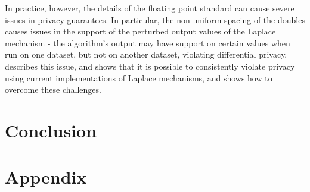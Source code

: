 \documentclass{article} %
\begin{document}
In practice, however, the details of the floating point standard can cause
severe issues in privacy guarantees. In particular, the non-uniform spacing of
the doubles causes issues in the support of the perturbed output values of the
Laplace mechanism - the algorithm's output may have support on certain values
when run on one dataset, but not on another dataset, violating differential
privacy. \cite{mironov2012significance} describes this issue, and shows that it
is possible to consistently violate privacy using current implementations of
Laplace mechanisms, and shows how to overcome these challenges.

\section{Conclusion}

{\small


}
\appendix
\section*{Appendix}
\end{document}
